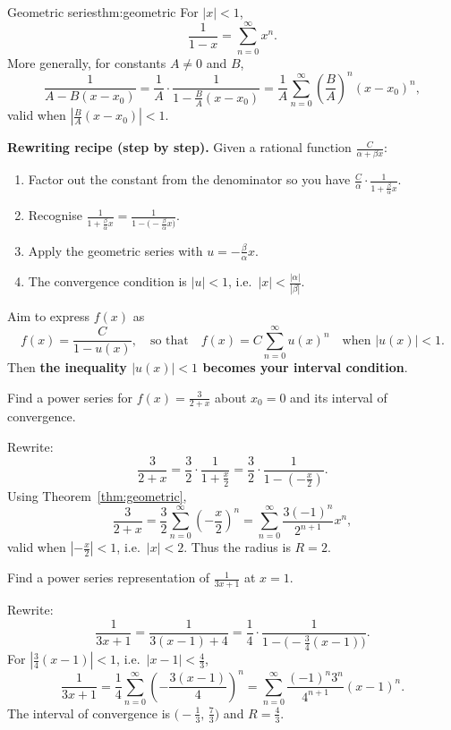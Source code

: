 \begin{theorem}{Geometric series}{thm:geometric}
For $|x|<1$,
\[
\frac{1}{1-x}=\sum_{n=0}^{\infty}x^n.
\]
More generally, for constants $A\neq 0$ and $B$,
\[
\frac{1}{A-B(x-x_0)}=\frac{1}{A}\cdot \frac{1}{1-\frac{B}{A}(x-x_0)}
=\frac{1}{A}\sum_{n=0}^{\infty}\left(\frac{B}{A}\right)^n (x-x_0)^n,
\]
valid when $\left|\frac{B}{A}(x-x_0)\right|<1$.
\end{theorem}

\noindent\textbf{Rewriting recipe (step by step).}
Given a rational function $\frac{C}{\alpha + \beta x}$:
\begin{enumerate}[leftmargin=*]
\item Factor out the constant from the denominator so you have $\frac{C}{\alpha}\cdot\frac{1}{1+\frac{\beta}{\alpha}x}$.
\item Recognise $\frac{1}{1+\frac{\beta}{\alpha}x}=\frac{1}{1-\bigl(-\frac{\beta}{\alpha}x\bigr)}$.
\item Apply the geometric series with $u=-\frac{\beta}{\alpha}x$.
\item The convergence condition is $|u|<1$, i.e.\ $|x|<\frac{|\alpha|}{|\beta|}$.
\end{enumerate}

\begin{keyformula}[title={Key Formula: ``rewrite to geometric form'' pattern}]
Aim to express $f(x)$ as
\[
f(x)=\frac{C}{1-u(x)},
\quad\text{so that}\quad
f(x)=C\sum_{n=0}^{\infty}u(x)^n
\quad\text{when }|u(x)|<1.
\]
Then \textbf{the inequality $|u(x)|<1$ becomes your interval condition}.
\end{keyformula}

\begin{examplebox}[title={Worked Example: rational function to power series}]
Find a power series for $\displaystyle f(x)=\frac{3}{2+x}$ about $x_0=0$ and its interval of convergence.

Rewrite:
\[
\frac{3}{2+x}=\frac{3}{2}\cdot \frac{1}{1+\frac{x}{2}}
=\frac{3}{2}\cdot \frac{1}{1-\left(-\frac{x}{2}\right)}.
\]
Using Theorem~\ref{thm:geometric},
\[
\frac{3}{2+x}=\frac{3}{2}\sum_{n=0}^{\infty}\left(-\frac{x}{2}\right)^n
=\sum_{n=0}^{\infty} \frac{3(-1)^n}{2^{n+1}}x^n,
\]
valid when $\left|-\frac{x}{2}\right|<1$, i.e.\ $|x|<2$. Thus the radius is $R=2$.
\end{examplebox}

\begin{examplebox}[title={Worked Example: expansion about a non-zero centre (Lecture Ex.~6.7)}]
Find a power series representation of $\displaystyle\frac{1}{3x+1}$ at $x=1$.

\smallskip
Rewrite:
\[
\frac{1}{3x+1}=\frac{1}{3(x-1)+4}
=\frac{1}{4}\cdot\frac{1}{1-\bigl(-\tfrac{3}{4}(x-1)\bigr)}.
\]
For $\left|\tfrac{3}{4}(x-1)\right|<1$, i.e.\ $|x-1|<\tfrac{4}{3}$,
\[
\frac{1}{3x+1}
=\frac{1}{4}\sum_{n=0}^{\infty}\left(-\frac{3(x-1)}{4}\right)^n
=\sum_{n=0}^{\infty}\frac{(-1)^n 3^n}{4^{n+1}}(x-1)^n.
\]
The interval of convergence is $\bigl(-\tfrac13,\,\tfrac73\bigr)$ and $R=\tfrac43$.
\end{examplebox}

